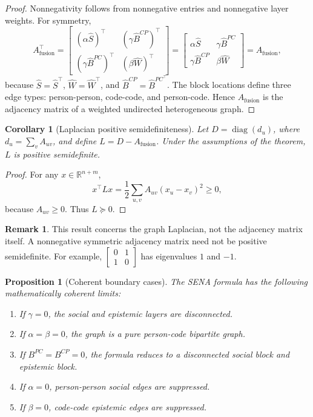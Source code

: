 \documentclass[11pt]{article}
\newtheorem{proposition}{Proposition}
\newtheorem{corollary}{Corollary}
\theoremstyle{definition}
\newtheorem{remark}{Remark}
\newcommand{\R}{\mathbb{R}}
\newcommand{\Af}{A_{\mathrm{fusion}}}
\newcommand{\Shat}{\widehat S}
\newcommand{\What}{\widehat W}
\newcommand{\Bpchat}{\widehat B^{PC}}
\newcommand{\Bcphat}{\widehat B^{CP}}
\newcommand{\diag}{\operatorname{diag}}
\begin{document}
\begin{proof}
Nonnegativity follows from nonnegative entries and nonnegative layer weights.
For symmetry,
\[
\Af^\top =
\begin{bmatrix}
(\alpha\Shat)^\top & (\gamma\Bcphat)^\top\\
(\gamma\Bpchat)^\top & (\beta\What)^\top
\end{bmatrix}
=
\begin{bmatrix}
\alpha\Shat & \gamma\Bpchat\\
\gamma\Bcphat & \beta\What
\end{bmatrix}
=\Af,
\]
because \(\Shat=\Shat^\top\), \(\What=\What^\top\), and
\(\Bcphat=\Bpchat^\top\). The block locations
define three edge types: person-person, code-code, and person-code. Hence
\(\Af\) is the adjacency matrix of a weighted undirected heterogeneous graph.
\end{proof}

\begin{corollary}[Laplacian positive semidefiniteness]
Let \(D=\diag(d_u)\), where \(d_u=\sum_v A_{uv}\), and define \(L=D-\Af\).
Under the assumptions of the theorem, \(L\) is positive semidefinite.
\end{corollary}

\begin{proof}
For any \(x\in\R^{n+m}\),
\[
x^\top Lx
=\frac12\sum_{u,v}A_{uv}(x_u-x_v)^2\ge 0,
\]
because \(A_{uv}\ge 0\). Thus \(L\succeq 0\).
\end{proof}

\begin{remark}
This result concerns the graph Laplacian, not the adjacency matrix itself. A
nonnegative symmetric adjacency matrix need not be positive semidefinite. For
example, \(\begin{bmatrix}0&1\\1&0\end{bmatrix}\) has eigenvalues \(1\) and
\(-1\).
\end{remark}

\begin{proposition}[Coherent boundary cases]
The SENA formula has the following mathematically coherent limits:
\begin{enumerate}[label=(\roman*)]
\item If \(\gamma=0\), the social and epistemic layers are disconnected.
\item If \(\alpha=\beta=0\), the graph is a pure person-code bipartite graph.
\item If \(B^{PC}=B^{CP}=0\), the formula reduces to a disconnected social block and
epistemic block.
\item If \(\alpha=0\), person-person social edges are suppressed.
\item If \(\beta=0\), code-code epistemic edges are suppressed.
\end{enumerate}
\end{proposition}
\end{document}
